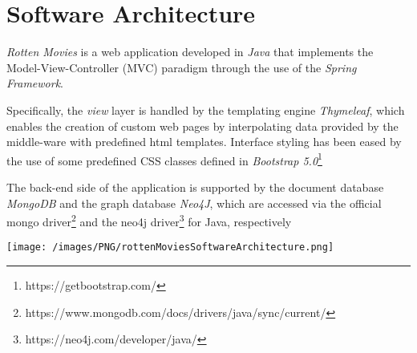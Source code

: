 %
%

\chapter{Software Architecture}
\emph{Rotten Movies} is a web application developed in \emph{Java} that implements the Model-View-Controller (MVC) paradigm through
the use of the \emph{Spring Framework}. 

Specifically, the \emph{view} layer is handled by the templating engine \emph{Thymeleaf}, 
which enables the creation of custom web pages by interpolating data provided by the middle-ware with predefined html templates.
Interface styling has been eased by the use of some predefined CSS classes defined in \emph{Bootstrap 5.0}\footnote{https://getbootstrap.com/}

The back-end side of the application is supported by the document database \emph{MongoDB} and the graph database \emph{Neo4J}, 
which are accessed via the official mongo driver\footnote{https://www.mongodb.com/docs/drivers/java/sync/current/} and the 
neo4j driver\footnote{https://neo4j.com/developer/java/} for Java, respectively

\hspace{2em}

\texttt{[image: /images/PNG/rottenMoviesSoftwareArchitecture.png]}

%